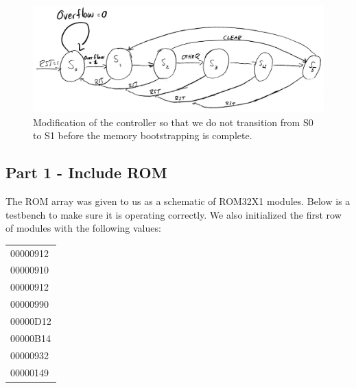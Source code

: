 \documentclass[12pt]{article}
\begin{document}
		\begin{figure}[h]
			\includegraphics[scale=.175]{Prelab2}
			\caption{Modification of the controller so that we do not transition from S0 to S1 before the memory bootstrapping is complete.}
		\end{figure}
		
		\newpage
	\subsection{Part 1 - Include ROM}
	The ROM array was given to us as a schematic of ROM32X1 modules. Below is a testbench to make sure it is operating correctly. We also initialized the first row of modules with the following values:

\begin{flushleft}
\begin{tabular}{|l|}
\hline
00000912 \\
00000910 \\
00000912 \\
00000990 \\
00000D12 \\
00000B14 \\
00000932 \\
00000149 \\
\hline
\end{tabular}
\end{flushleft}
\end{document}
